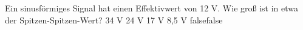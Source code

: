     {Ein sinusförmiges Signal hat einen Effektivwert von 12 V. Wie groß ist in etwa der Spitzen-Spitzen-Wert?}
    {34 V}
    {24 V}
    {17 V}
    {8,5 V}
    {false}{false}